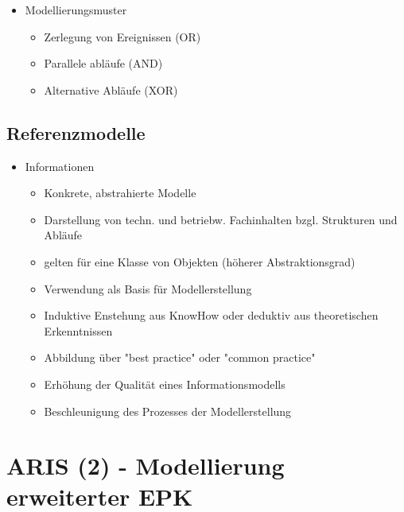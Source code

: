\begin{itemize}
	 \item Modellierungsmuster
	 	\begin{itemize}
	 	\item Zerlegung von Ereignissen (OR)
	 	\item Parallele abläufe (AND)
	 	\item Alternative Abläufe (XOR)
	 	\end{itemize}
			
\end{itemize}

\subsection{Referenzmodelle}
\begin{itemize}

	\item Informationen
		\begin{itemize}
		\item Konkrete, abstrahierte Modelle
		\item Darstellung von techn. und betriebw. Fachinhalten bzgl. Strukturen und Abläufe
		\item gelten für eine Klasse von Objekten (höherer Abstraktionsgrad)
		\item Verwendung als Basis für Modellerstellung
		\item Induktive Enstehung aus KnowHow oder deduktiv aus theoretischen Erkenntnissen
		\item Abbildung über "best practice" oder "common practice"
		\item Erhöhung der Qualität eines Informationsmodells
		\item Beschleunigung des Prozesses der Modellerstellung
		\end{itemize}
	

\end{itemize}

\section{ARIS (2) - Modellierung erweiterter EPK}

